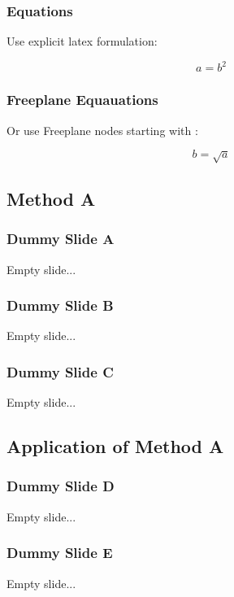 \begin{frame}[fragile]
\frametitle{Equations}
Use explicit latex formulation:


$$ a = b^2 $$


\end{frame}

\begin{frame}[fragile]
\frametitle{Freeplane Equauations}
Or use Freeplane nodes starting with :


\begin{equation}
 b = \sqrt{a}
\end{equation}


\end{frame}
\subsection{Method A}
\frame{\tableofcontents[sectionstyle=show/hide,subsectionstyle=show/shaded/hide]}

\begin{frame}[fragile]
\frametitle{Dummy Slide A}
Empty slide...


\end{frame}

\begin{frame}[fragile]
\frametitle{Dummy Slide B}
Empty slide...


\end{frame}

\begin{frame}[fragile]
\frametitle{Dummy Slide C}
Empty slide...


\end{frame}
\subsection{Application of Method A}
\frame{\tableofcontents[sectionstyle=show/hide,subsectionstyle=show/shaded/hide]}

\begin{frame}[fragile]
\frametitle{Dummy Slide D}
Empty slide...


\end{frame}

\begin{frame}[fragile]
\frametitle{Dummy Slide E}
Empty slide...


\end{frame}

